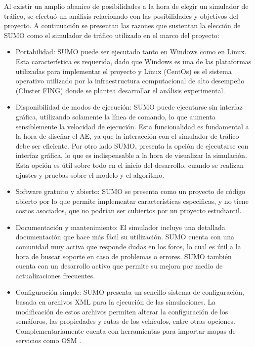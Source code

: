 Al existir un amplio abanico de posibilidades a la hora de elegir un simulador de tráfico, se efectuó un análisis relacionado con las posibilidades y objetivos del proyecto. A continuación se presentan las razones que sustentan la elección de SUMO como el simulador de tráfico utilizado en el marco del proyecto:

\begin{itemize}
	\item Portabilidad: SUMO puede ser ejecutado tanto en Windows como en Linux. Esta característica es requerida, dado que Windows es una de las plataformas utilizadas para implementar el proyecto y Linux (CentOs) es el sistema operativo utilizado por la infraestructura computacional de alto desempeño (Cluster FING) donde se plantea desarrollar el análisis experimental.
	
	\item Disponibilidad de modos de ejecución: SUMO puede ejecutarse sin interfaz gráfica, utilizando solamente la línea de comando, lo que aumenta sensiblemente la velocidad de ejecución. Esta funcionalidad es fundamental a la hora de diseñar el AE, ya que la interacción con el simulador de tráfico debe ser eficiente. Por otro lado SUMO, presenta la opción de ejecutarse con interfaz gráfica, lo que es indispensable a la hora de visualizar la simulación. Esta opción es útil sobre todo en el inicio del desarrollo, cuando se realizan ajustes y pruebas sobre el modelo y el algoritmo.
	
	\item Software gratuito y abierto: SUMO se presenta como un proyecto de código abierto por lo que permite implementar características especificas, y no tiene costos asociados, que no podrían ser cubiertos por un proyecto estudiantil. 
	
	\item Documentación y mantenimiento: El simulador incluye una detallada documentación que hace más fácil su utilización. SUMO cuenta con una comunidad muy activa que responde dudas en los foros, lo cual es útil a la hora de buscar soporte en caso de problemas o errores. SUMO también cuenta con un desarrollo activo que permite su mejora por medio de actualizaciones frecuentes.
	
	\item Configuración simple: SUMO presenta un sencillo sistema de configuración, basada en archivos XML para la ejecución de las simulaciones. La modificación de estos archivos permiten alterar la configuración de los semáforos, las propiedades y rutas de los vehículos, entre otras opciones. Complementariamente cuenta con herramientas para importar mapas de servicios como OSM \citep{OSM}.
	

\end{itemize}
